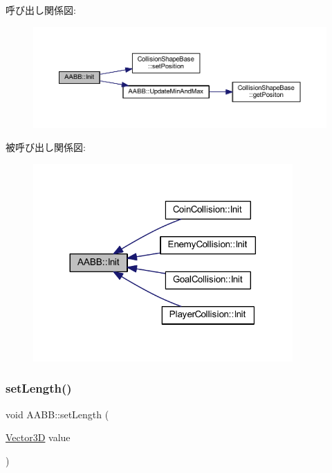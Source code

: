 呼び出し関係図\+:\nopagebreak
\begin{figure}[H]
\begin{center}
\leavevmode
\includegraphics[width=350pt]{class_a_a_b_b_a28167704c3b21de2ae9f70ac139781c4_cgraph}
\end{center}
\end{figure}
被呼び出し関係図\+:\nopagebreak
\begin{figure}[H]
\begin{center}
\leavevmode
\includegraphics[width=281pt]{class_a_a_b_b_a28167704c3b21de2ae9f70ac139781c4_icgraph}
\end{center}
\end{figure}
\mbox{\label{class_a_a_b_b_a76816b1eb872408d91dfa6880e5af109}} 
\subsubsection{\texorpdfstring{set\+Length()}{setLength()}}
{\footnotesize\ttfamily void A\+A\+B\+B\+::set\+Length (\begin{DoxyParamCaption}\item[{\mbox{\hyperlink{class_vector3_d}{Vector3D}}}]{value }\end{DoxyParamCaption})\hspace{0.3cm}{\ttfamily [inline]}}



